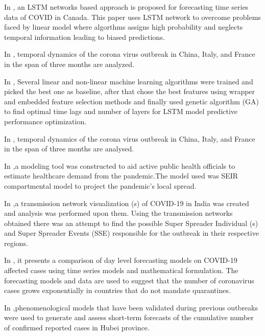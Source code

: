 In \cite{chimmula2020time}, an LSTM networks based approach is proposed for
forecasting time series data of COVID in Canada.
This paper uses LSTM network to overcome problems faced by linear model where
algorthms assigns high probability and neglects temporal information leading to
biased predictions.

In \cite{fanelli2020analysis}, temporal dynamics of the corona virus outbreak
in China, Italy, and France in the span of three months are analyzed.

In \cite{bouktif2018optimal}, Several linear and non-linear machine learning algorithms were trained and
picked the best one as baseline, after that chose the best features using wrapper and
embedded feature selection methods and finally used genetic algorithm (GA) to find
optimal time lags and number of layers for LSTM model predictive performance
optimization.

In \cite{yang2020modified}, temporal dynamics of the corona virus outbreak in China, Italy, and France in
the span of three months are analysed.


In \cite{rainisch2020dynamic},a modeling tool was constructed to aid active public health officials to estimate
healthcare demand from the pandemic.The model used was SEIR compartmental model
to project the pandemic’s local spread.

In \cite{singh2020connecting},a transmission network visualization (s) of COVID-19 in India was created and
analysis was performed upon them. Using the transmission networks obtained there was
an attempt to find the possible Super Spreader Individual (s) and Super Spreader Events
(SSE) responsible for the outbreak in their respective regions.

In \cite{elmousalami2020day}, it presents a comparison of day level forecasting models on COVID-19 affected
cases using time series models and mathematical formulation. The forecasting models
and data are used to suggest that the number of coronavirus cases grows exponentially
in countries that do not mandate quarantines.

In \cite{roosa2020real},phenomenological models that have been validated during previous outbreaks
were used to generate and assess short-term forecasts of the cumulative number of
confirmed reported cases in Hubei province.

